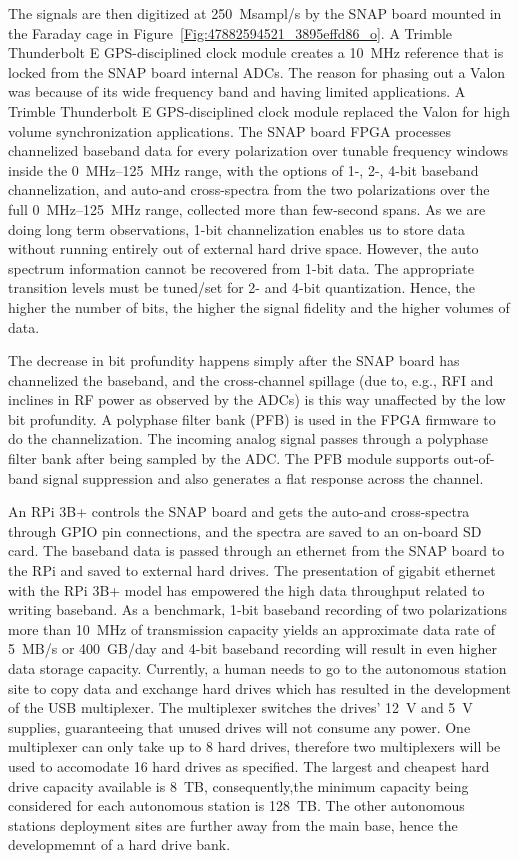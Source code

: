 The signals are then digitized at \SI{250}{Msampl/s} by the SNAP board mounted in the Faraday cage in Figure~\ref{Fig:47882594521_3895effd86_o}. A Trimble Thunderbolt E GPS-disciplined clock module creates a \SI{10}{\mega\hertz} reference that is locked from the SNAP board internal ADCs. The reason for phasing out a Valon was because of its wide frequency band and having limited applications. A Trimble Thunderbolt E GPS-disciplined clock module replaced the Valon for high volume synchronization applications. The SNAP board FPGA processes channelized baseband data for every polarization over tunable frequency windows inside the \SIrange{0}{125}{\mega\hertz} range, with the options of 1-, 2-, 4-bit baseband channelization, and auto-and cross-spectra from the two polarizations over the full \SIrange{0}{125}{\mega\hertz} range, collected more than few-second spans. As we are doing long term observations, 1-bit channelization enables us to store data without running entirely out of external hard drive space. However, the auto spectrum information cannot be recovered from 1-bit data. The appropriate transition levels must be tuned/set for 2- and 4-bit quantization. Hence, the higher the number of bits, the higher the signal fidelity and the higher volumes of data.

The decrease in bit profundity happens simply after the SNAP board has channelized the baseband, and the cross-channel spillage (due to, e.g., RFI and inclines in RF power as observed by the ADCs) is this way unaffected by the low bit profundity. A polyphase filter bank (PFB) is used in the FPGA firmware to do the channelization. The incoming analog signal passes through a polyphase filter bank after being sampled by the ADC. The PFB module supports out-of-band signal suppression and also generates a flat response across the channel.

An RPi 3B+ controls the SNAP board and gets the auto-and cross-spectra through GPIO pin connections, and the spectra are saved to an on-board SD card. The baseband data is passed through an ethernet from the SNAP board to the RPi and saved to external hard drives. The presentation of gigabit ethernet with the RPi 3B+ model has empowered the high data throughput related to writing baseband. As a benchmark, 1-bit baseband recording of two polarizations more than \SI{10}{\mega\hertz} of transmission capacity yields an approximate data rate of 5~MB/s or 400~GB/day and 4-bit baseband recording will result in even higher data storage capacity. Currently, a human needs to go to the autonomous station site to copy data and exchange hard drives which has resulted in the development of the USB multiplexer. The multiplexer switches the drives' \SI{12}{\volt} and \SI{5}{\volt} supplies, guaranteeing that unused drives will not consume any power. One multiplexer can only take up to 8 hard drives, therefore two multiplexers will be used to accomodate 16 hard drives as specified. The largest and cheapest hard drive capacity available is 8~TB, consequently,the minimum capacity being considered for each autonomous station is 128~TB. The other autonomous stations deployment sites are further away from the main base, hence the developmemnt of a hard drive bank.

